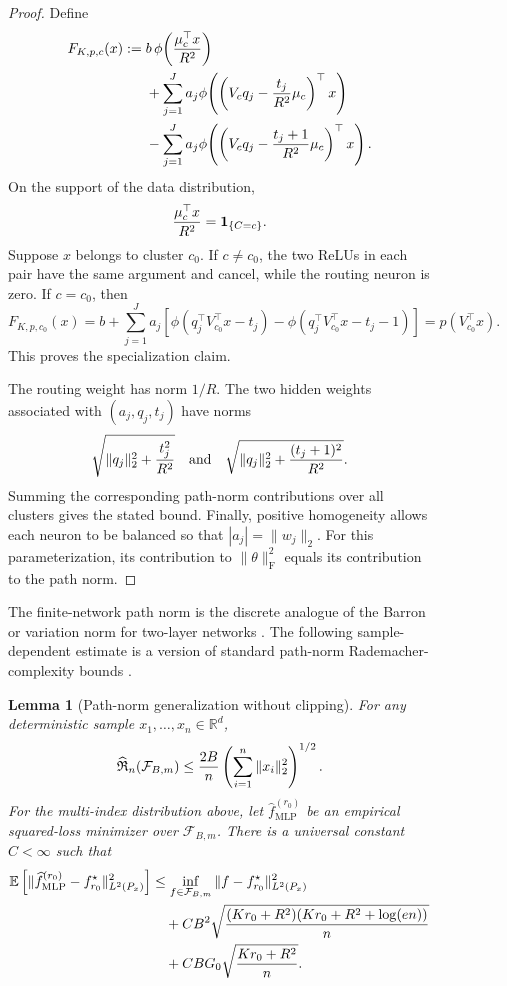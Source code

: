 \documentclass{article}
\newtheorem{lemma}[lemma]{Lemma}
\begin{document}
\begin{figure}
\begin{proof}
Define
\begin{align*}
    F_{K,p,c}(x)
    :=\;&
        b\,\phi\!\left({\mu_c^\top x\over R^2}\right)\\
    &+\sum_{j=1}^J a_j
        \phi\!\left(
            \left(V_cq_j-{t_j\over R^2}\mu_c\right)^\top x
        \right)\\
    &-\sum_{j=1}^J a_j
        \phi\!\left(
            \left(V_cq_j-{t_j+1\over R^2}\mu_c\right)^\top x
        \right).
\end{align*}
On the support of the data distribution,
\[
    {\mu_c^\top x\over R^2}=\mathbf1_{\{C=c\}}.
\]
Suppose $x$ belongs to cluster $c_0$. If $c\neq c_0$, the two ReLUs in
each pair have the same argument and cancel, while the routing neuron is
zero. If $c=c_0$, then
\[
    F_{K,p,c_0}(x)
    =b+\sum_{j=1}^J a_j
      \left[
        \phi(q_j^\top V_{c_0}^\top x-t_j)
        -\phi(q_j^\top V_{c_0}^\top x-t_j-1)
      \right]
    =p(V_{c_0}^\top x).
\]
This proves the specialization claim.

The routing weight has norm $1/R$. The two hidden weights associated with
$(a_j,q_j,t_j)$ have norms
\[
    \sqrt{\|q_j\|_2^2+{t_j^2\over R^2}}
    \quad\text{and}\quad
    \sqrt{\|q_j\|_2^2+{(t_j+1)^2\over R^2}}.
\]
Summing the corresponding path-norm contributions over all clusters gives
the stated bound. Finally, positive homogeneity allows each neuron to be
balanced so that $|a_j|=\|w_j\|_2$. For this parameterization, its
contribution to $\|\theta\|_{\mathrm F}^2$ equals its contribution to the
path norm.
\end{proof}

The finite-network path norm is the discrete analogue of the Barron or
variation norm for two-layer networks
\citep{bach2017breaking,e2022barron}.
The following sample-dependent estimate is a version of standard
path-norm Rademacher-complexity bounds
\citep{e2022barron,golowich2018size}.

\begin{lemma}[Path-norm generalization without clipping]
\label{lem:path-rademacher}
For any deterministic sample $x_1,\ldots,x_n\in\mathbb R^d$,
\[
    \widehat{\mathfrak R}_n(\mathcal F_{B,m})
    \leq
    {2B\over n}
    \left(\sum_{i=1}^n\|x_i\|_2^2\right)^{1/2}.
\]
For the multi-index distribution above, let
$\widehat f_{\mathrm{MLP}}^{(r_0)}$ be an empirical squared-loss minimizer
over $\mathcal F_{B,m}$. There is a universal constant $C<\infty$ such that
\begin{align*}
    \mathbb E\left[
        \|\widehat f_{\mathrm{MLP}}^{(r_0)}-f_{r_0}^\star
        \|_{L^2(P_x)}^2
    \right]
    &\leq
    \inf_{f\in\mathcal F_{B,m}}
    \|f-f_{r_0}^\star\|_{L^2(P_x)}^2\\
    &\quad+
    CB^2\sqrt{
        {(Kr_0+R^2)(Kr_0+R^2+\log(en))\over n}
    }\\
    &\quad+
    CBG_0\sqrt{{Kr_0+R^2\over n}}.
\end{align*}
\end{lemma}


\end{figure}
\end{document}
